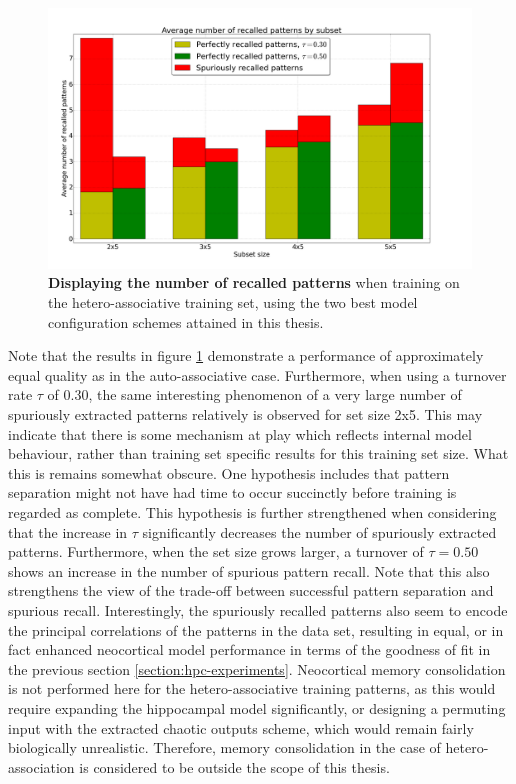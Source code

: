 \begin{figure}
    \centering
    \includegraphics[width=15cm]{fig/tr50_tr30}
    \caption{\textbf{Displaying the number of recalled patterns} when training on the hetero-associative training set, using the two best model configuration schemes attained in this thesis.}
    \label{fig:hetero-results}
\end{figure}

Note that the results in figure \ref{fig:hetero-results} demonstrate a performance of approximately equal quality as in the auto-associative case. Furthermore, when using a turnover rate $\tau$ of $0.30$, the same interesting phenomenon of a very large number of spuriously extracted patterns relatively is observed for set size 2x5. This may indicate that there is some mechanism at play which reflects internal model behaviour, rather than training set specific results for this training set size. What this is remains somewhat obscure. One hypothesis includes that pattern separation might not have had time to occur succinctly before training is regarded as complete. This hypothesis is further strengthened when considering that the increase in $\tau$ significantly decreases the number of spuriously extracted patterns. Furthermore, when the set size grows larger, a turnover of $\tau=0.50$ shows an increase in the number of spurious pattern recall. Note that this also strengthens the view of the trade-off between successful pattern separation and spurious recall. Interestingly, the spuriously recalled patterns also seem to encode the principal correlations of the patterns in the data set, resulting in equal, or in fact enhanced neocortical model performance in terms of the goodness of fit in the previous section \ref{section:hpc-experiments}. Neocortical memory consolidation is not performed here for the hetero-associative training patterns, as this would require expanding the hippocampal model significantly, or designing a permuting input with the extracted chaotic outputs scheme, which would remain fairly biologically unrealistic. Therefore, memory consolidation in the case of hetero-association is considered to be outside the scope of this thesis.

